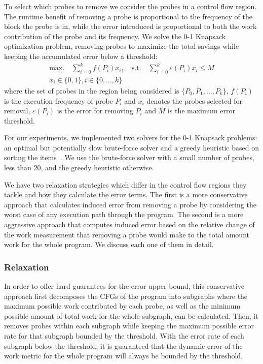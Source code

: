     To select which probes to remove we consider the probes in a control flow region. The runtime benefit of removing a probe is
    proportional to the frequency of the block the probe is in, while the error introduced is proportional to both the work contribution of
    the probe and its frequency. We solve the 0-1 Knapsack optimization problem, removing probes to maximize the total savings while
    keeping the accumulated error below a threshold:
    \begin{gather*}
        \textrm{max.}\quad\sum_{i=0}^{k} f(P_i)x_i,\quad
        \textrm{s.t.}\quad\sum_{i=0}^{k} \varepsilon(P_i)x_i \leq M \\
        x_i\in\{0,1\}, i\in\{0,\ldots,k\}
    \end{gather*}
    where the set of probes in the region being considered is $\{P_0, P_1, \ldots, P_k\}$, $f(P_i)$ is the execution frequency of probe
    $P_i$ and $x_i$ denotes the probes selected for removal, $\varepsilon(P_i)$ is the error for removing $P_i$ and $M$ is the maximum
    error threshold.

    For our experiments, we implemented two solvers for the 0-1 Knapsack problems: an optimal but potentially slow brute-force solver and a
    greedy heuristic based on sorting the items~\cite{dantzig57}. We use the brute-force solver with a small number of probes, less than
    20, and the greedy heuristic otherwise.

    We have two relaxation strategies which differ in the control flow regions they tackle and how they calculate the error terms. The
    first is a more conservative approach that calculates induced error from removing a probe by considering the worst case of any
    execution path through the program. The second is a more aggressive approach that computes induced error based on the relative change
    of the work measurement that removing a probe would make to the total amount work for the whole program. We discuss each one of them
    in detail.

    \subsubsection{\WCRelaxTitle Relaxation}

    In order to offer hard guarantees for the error upper bound, this conservative approach first decomposes the CFGs of the program into
    subgraphs where the maximum possible work contributed by each probe, as well as the minimum possible amount of total work for the whole
    subgraph, can be calculated. Then, it removes probes within each subgraph while keeping the maximum possible error rate for that
    subgraph bounded by the threshold. With the error rate of each subgraph below the threshold, it is guaranteed that the dynamic error of
    the work metric for the whole program will always be bounded by the threshold.

